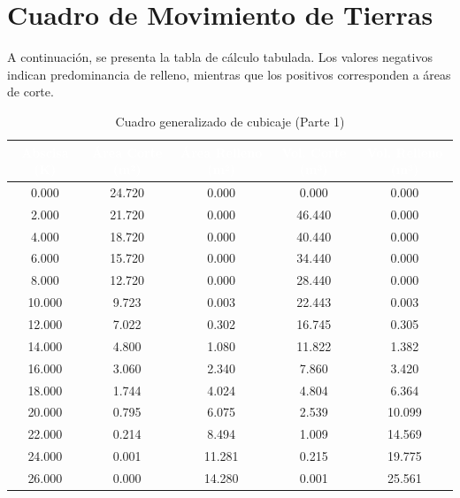 \documentclass[11pt,letterpaper]{article}
\begin{document}
\section{Cuadro de Movimiento de Tierras}
A continuación, se presenta la tabla de cálculo tabulada. Los valores negativos indican predominancia de relleno, mientras que los positivos corresponden a áreas de corte.
\begin{table}[H]
  \centering
  \small
  \caption{Cuadro generalizado de cubicaje (Parte 1)}
  \label{tab:cubicaje_0}
  \begin{tabular}{|c|c|c|c|c|}
    \hline
    \rowcolor{GeoBlue}
    \textcolor{white}{\textbf{Abscisa (K)}} & \textcolor{white}{\textbf{Área Corte (m²)}} & \textcolor{white}{\textbf{Área Relleno (m²)}} & \textcolor{white}{\textbf{Vol. Corte (m³)}} & \textcolor{white}{\textbf{Vol. Relleno (m³)}} \\
    \hline
    \rowcolor{GeoBlue!5}
    0.000 & 24.720 & 0.000 & 0.000 & 0.000 \\
    \hline
    \rowcolor{white}
    2.000 & 21.720 & 0.000 & 46.440 & 0.000 \\
    \hline
    \rowcolor{GeoBlue!5}
    4.000 & 18.720 & 0.000 & 40.440 & 0.000 \\
    \hline
    \rowcolor{white}
    6.000 & 15.720 & 0.000 & 34.440 & 0.000 \\
    \hline
    \rowcolor{GeoBlue!5}
    8.000 & 12.720 & 0.000 & 28.440 & 0.000 \\
    \hline
    \rowcolor{white}
    10.000 & 9.723 & 0.003 & 22.443 & 0.003 \\
    \hline
    \rowcolor{GeoBlue!5}
    12.000 & 7.022 & 0.302 & 16.745 & 0.305 \\
    \hline
    \rowcolor{white}
    14.000 & 4.800 & 1.080 & 11.822 & 1.382 \\
    \hline
    \rowcolor{GeoBlue!5}
    16.000 & 3.060 & 2.340 & 7.860 & 3.420 \\
    \hline
    \rowcolor{white}
    18.000 & 1.744 & 4.024 & 4.804 & 6.364 \\
    \hline
    \rowcolor{GeoBlue!5}
    20.000 & 0.795 & 6.075 & 2.539 & 10.099 \\
    \hline
    \rowcolor{white}
    22.000 & 0.214 & 8.494 & 1.009 & 14.569 \\
    \hline
    \rowcolor{GeoBlue!5}
    24.000 & 0.001 & 11.281 & 0.215 & 19.775 \\
    \hline
    \rowcolor{white}
    26.000 & 0.000 & 14.280 & 0.001 & 25.561 \\

\end{tabular}
\end{table}
\end{document}

